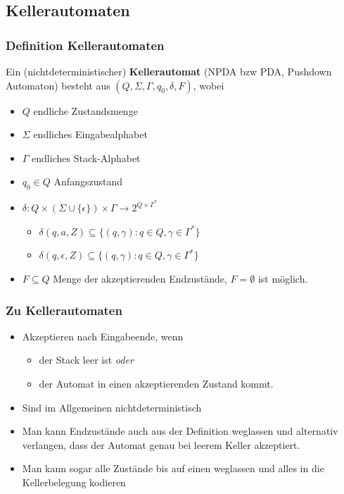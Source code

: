 \subsection{Kellerautomaten}
\begin{frame}
	\frametitle{Definition Kellerautomaten}
	Ein (nichtdeterministischer) \textbf{Kellerautomat} (NPDA bzw PDA, Pushdown Automaton) besteht aus $(Q, \Sigma, \Gamma, q_0,\delta, F)$, wobei
	\begin{itemize}
		\item $Q$ endliche Zustandsmenge
		\item $\Sigma$ endliches Eingabealphabet
		\item $\Gamma$ endliches Stack-Alphabet
		\item $q_0 \in Q$ Anfangszustand
		\item $\delta : Q \times ( \Sigma \cup \{\epsilon\}) \times \Gamma \rightarrow 2^{Q \times \Gamma^*}$
		\begin{itemize}
			\item $\delta(q, a, Z) \subseteq \{(q,\gamma) : q \in Q, \gamma \in \Gamma^*\}$
			\item $\delta(q, \epsilon, Z) \subseteq \{(q,\gamma) : q \in Q, \gamma \in \Gamma^*\}$
		\end{itemize}
		\item $F \subseteq Q$ Menge der akzeptierenden Endzustände, $F=\emptyset$ ist möglich.
		
		\vspace{-4cm}
	\end{itemize}
\end{frame}

\begin{frame}
\frametitle{Zu Kellerautomaten}
\begin{itemize}
\item Akzeptieren nach Eingabeende, wenn \begin{itemize}
	\item der Stack leer ist \emph{oder}
	\item der Automat in einen akzeptierenden Zustand kommt.
\end{itemize}
\item Sind im Allgemeinen nichtdeterministisch
\item Man kann Endzustände auch aus der Definition weglassen und alternativ verlangen, dass der Automat genau bei leerem Keller akzeptiert.
\item Man kann sogar alle Zustände bis auf einen weglassen und alles in die Kellerbelegung kodieren
\end{itemize}
\end{frame}

